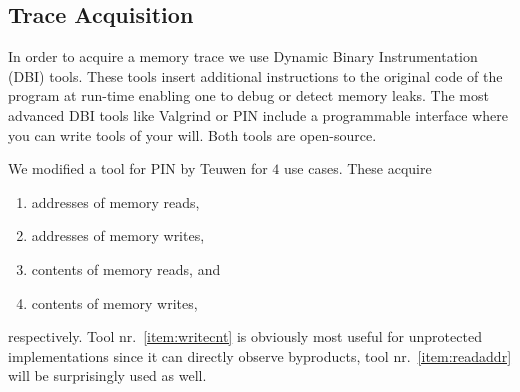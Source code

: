 
\subsection{Trace Acquisition}
\label{sec:tracq}

In order to acquire a memory trace we use Dynamic Binary Instrumentation (DBI) tools. These tools insert additional instructions to the original code of the program at run-time enabling one to debug or detect memory leaks. The most advanced DBI tools like Valgrind \cite{nethercote2007valgrind} or PIN \cite{luk2005pin} include a programmable interface where you can write tools of your will. Both tools are open-source.

We modified a tool for PIN by Teuwen \cite{teuwen2015movfuscator} for $4$ use cases. These acquire
\begin{enumerate}
	\item addresses of memory reads, \label{item:readaddr}
	\item addresses of memory writes,   %
	\item contents of memory reads, and   %
	\item contents of memory writes, \label{item:writecnt}
\end{enumerate}
respectively. Tool nr.\ \ref{item:writecnt} is obviously most useful for unprotected implementations since it can directly observe byproducts, tool nr.\ \ref{item:readaddr} will be surprisingly used as well.

